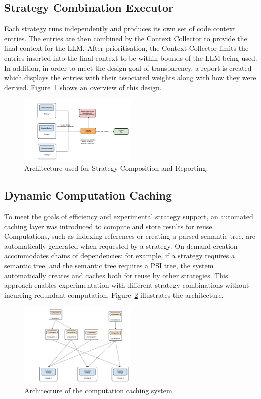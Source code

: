 \documentclass[conference]{IEEEtran}
\begin{document}
\subsection{Strategy Combination Executor}
Each strategy runs independently and produces its own set of code context entries. The entries are then 
combined by the Context Collector to provide the final context for the LLM.  After prioritisation, the Context Collector
limits the entries inserted into the final context to be within bounds of the LLM being used. In addition,
in order to meet the design goal of transparency, a report is created which displays the entries with their 
associated weights along with how they were derived. Figure~\ref{fig:strategy-combining} 
shows an overview of this design.


\begin{figure}[htbp]
\centerline{\includegraphics[width=0.5\textwidth]{StrategyCombiningArchitecture.png}}
\caption{Architecture used for Strategy Composition and Reporting.}
\label{fig:strategy-combining}
\end{figure}

\subsection{Dynamic Computation Caching}
To meet the goals of efficiency and experimental strategy support, 
an automated caching layer was introduced to compute and store results for reuse. 
Computations, such as indexing references or creating a parsed semantic tree, are automatically generated when requested by a strategy. 
On-demand creation accommodates chains of dependencies: for example, if a strategy requires a semantic tree, 
and the semantic tree requires a PSI tree, the system automatically creates and caches both for reuse by other strategies. 
This approach enables experimentation with different strategy combinations without incurring redundant computation. 
Figure~\ref{fig:computation-cache} illustrates the architecture.


\begin{figure}[htbp]
\centerline{\includegraphics[width=0.5\textwidth]{CachedComputationArchitecture.png}}
\caption{Architecture of the computation caching system.}
\label{fig:computation-cache}
\end{figure}
\end{document}
